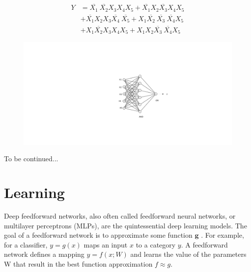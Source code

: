 \documentclass[12pt]{article}
\begin{document}
\begin{equation}
 \begin{split}
Y & = \overline{X_1} \  \overline{X_2}X_3X_4X_5  + \overline{X_1} X_2 \overline{X_3} X_4 X_5 \\
  & + \overline{X_1}X_2X_3\overline{X_4} \ \overline{X_5} +  X_1\overline{X_2} \ \overline{X_3} \ \overline{X_4} X_5 \\
  & + X_1 \overline{X_2} X_3X_4X_5 + X_1X_2 \overline{X_3} \ \overline{X_4} X_5    
  \end{split}
 \end{equation}





\begin{figure}[h]
	\centering
	\includegraphics[width=1.1\linewidth]{img/nn-1}
\end{figure}







To be continued...

\cleardoublepage


\section{Learning}

Deep feedforward networks, also often called feedforward neural networks,
or multilayer perceptrons (MLPs), are the quintessential deep learning models.
The goal of a feedforward network is to approximate some function  $\textbf{g}$ . For example,
for a classifier, $ y = g (x)$ maps an input $x$ to a category $y$. A feedforward network
defines a mapping $y = f (x; W)$ and learns the value of the parameters W that result
in the best function approximation $f \approx g$.
\end{document}
